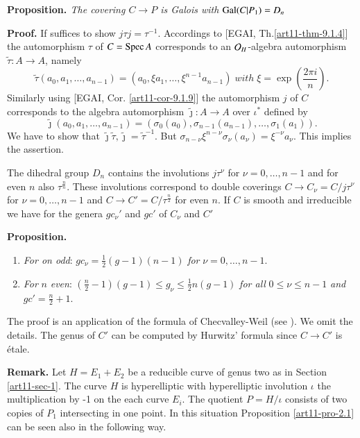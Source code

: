 \medskip
\noindent
{\bfseries {} Proposition. \label{art11-pro-2.1}} \textit{The covering $C\rightarrow P$ is Galois with $\operatorname{Gal}(C|P_{1}) =D_{n}$}

\medskip
\noindent
{\bfseries Proof.} If suffices to show $j\tau j =\tau^{-1}$. Accordings to [EGAI, Th.\ref{art11-thm-9.1.4}] the automorphism $\tau$ of $C=\operatorname{Spec} A$ corresponds to an $\mathcal{O}_{H}$-algebra automorphism $\tilde{\tau}: A\rightarrow A$, namely
$$
\tilde{\tau}(a_{0}, a_{1}, \ldots, a_{n-1}) =(a_{0}, \xi a_{1}, \ldots, \xi^{n-1}a_{n-1})\; with \;\xi = \exp \left(\frac{2\pi i}{n}\right).
$$ 
Similarly using [EGAI, Cor. \ref{art11-cor-9.1.9}] the automorphism $j$ of $C$ corresponds to the algebra automorphism $\tilde{\jmath} : A\rightarrow A$ over $\iota^{*}$ defined by
$$
\tilde{\jmath} (a_{0}, a_{1}, \ldots, a_{n-1}) = (\sigma_{0}(a_{0}), \sigma_{n-1}(a_{n-1}), \ldots, \sigma_{1}(a_{1})).
$$
We have to show that $\tilde{\jmath}\tilde{\tau}, \tilde{\jmath} = \tilde{\tau}^{-1}$. But $\sigma_{n-\nu}\xi^{n-\nu}\sigma_{\nu}(a_{\nu}) = \xi^{-\nu}a_{\nu}$. This implies the assertion.

\noindent
The dihedral group $D_{n}$ contains the involutions $j\tau^{\nu}$ for $\nu = 0,\ldots,n-1$ and for even $n$ also $\tau^{\frac{n}{n}}$. These involutions correspond to double coverings $C\rightarrow C_{\nu} = C/j\tau^{\nu}$ for $\nu =0, \ldots,n-1$ and $C\rightarrow C'= C/\tau^{\frac{n}{2}}$ for even $n$. If $C$ is smooth and irreducible we have for the genera $gc_{\nu}'$ and $gc'$ of $C_{\nu}$ and $C'$ 

\medskip
\noindent
{\bfseries {} Proposition.\label{art11-prop-2.2}}
~

\begin{enumerate}[{\it a)}]
 \item \textit{For on odd}: $gc_{\nu} = \frac{1}{2}(g-1)(n-1)$ \textit{for} $\nu =0,\ldots,
  n-1$.\label{art11-prop2.2-enum-1}
 \item \textit{For} $n$ \textit{even}: $(\frac{n}{2}-1)(g-1) \leq g_{\nu}\leq \frac{1}{2}n(g-1)$ \textit{for all} $0 \leq \nu \leq n-1$ \textit{and} $gc' =\frac{n}{2}+1$.\label{art11-prop2.2-enum-2}
\end{enumerate}

The proof is an application of the formula of Checvalley-Weil (see \cite{art11-keyC-W}). We omit the details. The genus of $C'$ can be computed by Hurwitz' formula since $C\rightarrow C'$ is \'etale.

\medskip
\noindent
{\bfseries {} Remark.\label{art11-remark-2.3}} Let $ H =E_{1}+ E_{2}$ be a reducible curve of genus two as in Section \ref{art11-sec-1}. The curve $H$ is hyperelliptic with hyperelliptic involution $\iota$ the multiplication by -1 on the each curve $E_{i}$. The quotient $P=H /\iota$ consists of two copies of $P_{1}$ intersecting in one point. In this situation Proposition \ref{art11-pro-2.1} can be seen also in the following way.

